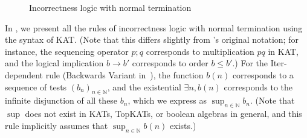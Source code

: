 \begin{figure}
    \caption{Incorrectness logic with normal termination}\label{fig: normal terminating Inc rule}
\end{figure}

In , we present all the rules of
incorrectness logic with normal termination using the syntax of KAT.  (Note
that this differs slightly from \citeauthor{OHearn_2020}'s
original notation; for instance, the sequencing operator \(p;q\) corresponds to
multiplication \(pq\) in KAT, and the logical implication \(b → b'\)
corresponds to order \(b \leq b'\).)  For the Iter-dependent rule (Backwards
Variant in~\cite{OHearn_2020}), the function \(b(n)\) corresponds
to a sequence of tests \((b_n)_{n \in ℕ}\), and the existential
\(∃ n, b(n)\) corresponds to the infinite disjunction of all these
\(b_n\), which we express as \(\sup_{n ∈ ℕ} b_n\).  (Note that \(\sup\)
does not exist in KATs, TopKATs, or boolean algebras in general, and this rule
implicitly assumes that \(\sup_{n \in ℕ} b(n)\) exists.)

